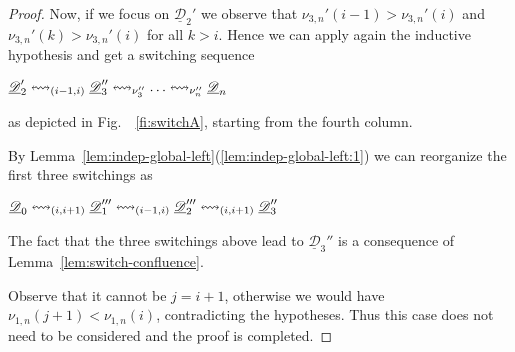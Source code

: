 \documentclass[a4paper,UKenglish,cleveref,pdftex, thm-restate,numberwithinsect,anonymous]{lipics}
\newcommand{\dder}[1]{\mathscr{#1}}
\newcommand{\der}[1]{\underline{\dder{#1}}}
\newcommand{\shift}[1]{\ensuremath{\mathrel{{\leftrightsquigarrow}_{#1}}}}
\begin{document}
\begin{proof}
  Now, if we focus on $\der{D}_2'$ we observe that
  $\nu_{3,n}'(i-1) > \nu_{3,n}'(i)$ and
  $\nu_{3,n}'(k) > \nu_{3,n}'(i)$ for all $k > i$. Hence we can apply
  again the inductive hypothesis and get a switching sequence
    \begin{center}
    $\der{D}_2' \shift{\transp{i-1}[i]} \der{D}_3'' \shift{\nu_3''} \ldots
    \shift{\nu_n''} \der{D}_n$
  \end{center}
  as depicted in Fig.~~\ref{fi:switchA}, starting from the fourth column.

  By Lemma~\ref{lem:indep-global-left}(\ref{lem:indep-global-left:1}) we can
  reorganize the first three switchings as

  \begin{center}
    $\der{D}_0 \shift{\transp{i}} \der{D}_1'''
    \shift{\transp{i-1}[i]} \der{D}_2'''
    \shift{\transp{i}} \der{D}_3''$
  \end{center}

  The fact that the three switchings above lead to $\der{D}_3''$ is a
  consequence of Lemma~\ref{lem:switch-confluence}.

  \bigskip

  Observe that it cannot be $j=i+1$, otherwise we would have
  $\nu_{1,n}(j+1) < \nu_{1,n}(i)$, contradicting the hypotheses. Thus
  this case does not need to be considered and the proof is completed.  
\end{proof}
 
\end{document}
